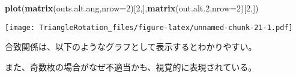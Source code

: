 \documentclass[]{article}
\newenvironment{Shaded}{\begin{snugshade}}{\end{snugshade}}
\newcommand{\KeywordTok}[1]{\textcolor[rgb]{0.13,0.29,0.53}{\textbf{#1}}}
\newcommand{\DataTypeTok}[1]{\textcolor[rgb]{0.13,0.29,0.53}{#1}}
\newcommand{\DecValTok}[1]{\textcolor[rgb]{0.00,0.00,0.81}{#1}}
\newcommand{\StringTok}[1]{\textcolor[rgb]{0.31,0.60,0.02}{#1}}
\newcommand{\ControlFlowTok}[1]{\textcolor[rgb]{0.13,0.29,0.53}{\textbf{#1}}}
\newcommand{\OperatorTok}[1]{\textcolor[rgb]{0.81,0.36,0.00}{\textbf{#1}}}
\newcommand{\NormalTok}[1]{#1}
\begin{document}
\begin{Shaded}
\begin{Highlighting}[]
\KeywordTok{plot}\NormalTok{(}\KeywordTok{matrix}\NormalTok{(outs.alt.ang,}\DataTypeTok{nrow=}\DecValTok{2}\NormalTok{)[}\DecValTok{2}\NormalTok{,],}\KeywordTok{matrix}\NormalTok{(out.alt.}\DecValTok{2}\NormalTok{,}\DataTypeTok{nrow=}\DecValTok{2}\NormalTok{)[}\DecValTok{2}\NormalTok{,])}
\end{Highlighting}
\end{Shaded}

\texttt{[image: TriangleRotation\_files/figure-latex/unnamed-chunk-21-1.pdf]}

合致関係は、以下のようなグラフとして表示するとわかりやすい。

また、奇数枚の場合がなぜ不適当かも、視覚的に表現されている。

\begin{Shaded}
\end{Shaded}
\end{document}
